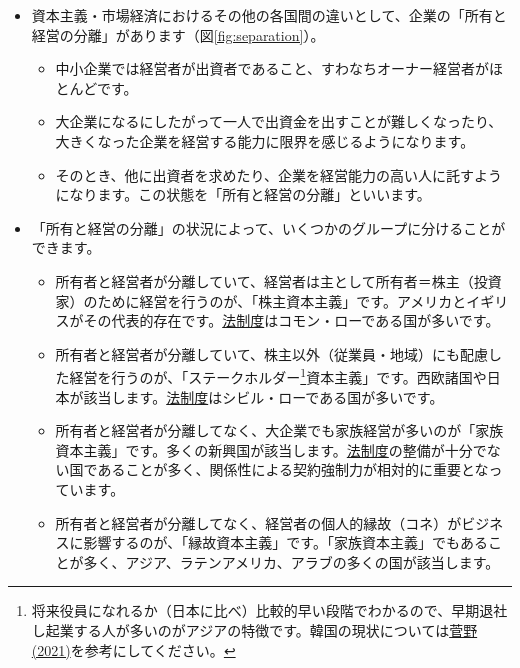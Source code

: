 \documentclass[
]{book}
\begin{document}
\begin{itemize}
\item
  資本主義・市場経済におけるその他の各国間の違いとして、企業の「所有と経営の分離」があります（図\ref{fig:separation}）。

  \begin{itemize}
  \item
    中小企業では経営者が出資者であること、すわなちオーナー経営者がほとんどです。
  \item
    大企業になるにしたがって一人で出資金を出すことが難しくなったり、大きくなった企業を経営する能力に限界を感じるようになります。
  \item
    そのとき、他に出資者を求めたり、企業を経営能力の高い人に託すようになります。この状態を「所有と経営の分離」といいます。
  \end{itemize}
\item
  「所有と経営の分離」の状況によって、いくつかのグループに分けることができます。

  \begin{itemize}
  \item
    所有者と経営者が分離していて、経営者は主として所有者＝株主（投資家）のために経営を行うのが、「株主資本主義」です。アメリカとイギリスがその代表的存在です。\protect\hyperlink{law}{法制度}はコモン・ローである国が多いです。
  \item
    所有者と経営者が分離していて、株主以外（従業員・地域）にも配慮した経営を行うのが、「ステークホルダー\footnote{将来役員になれるか（日本に比べ）比較的早い段階でわかるので、早期退社し起業する人が多いのがアジアの特徴です。韓国の現状については\href{https://toyokeizai.net/articles/-/473559}{菅野 (2021)}を参考にしてください。}資本主義」です。西欧諸国や日本が該当します。\protect\hyperlink{law}{法制度}はシビル・ローである国が多いです。
  \item
    所有者と経営者が分離してなく、大企業でも家族経営が多いのが「家族資本主義」です。多くの新興国が該当します。\protect\hyperlink{law}{法制度}の整備が十分でない国であることが多く、関係性による契約強制力が相対的に重要となっています。
  \item
    所有者と経営者が分離してなく、経営者の個人的縁故（コネ）がビジネスに影響するのが、「縁故資本主義」です。「家族資本主義」でもあることが多く、アジア、ラテンアメリカ、アラブの多くの国が該当します。
  \end{itemize}
\end{itemize}
\end{document}
